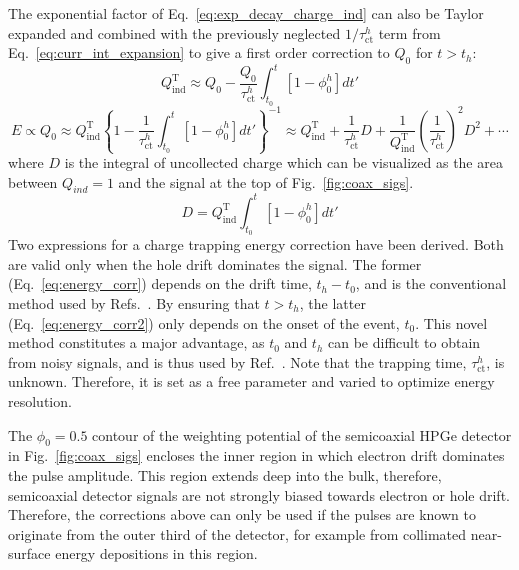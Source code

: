 \noindent The exponential factor of Eq.~\ref{eq:exp_decay_charge_ind} can also be Taylor expanded and combined with the previously neglected $1/\tau^h_\text{ct}$ term from Eq.~\ref{eq:curr_int_expansion} to give a first order correction to $Q_0$ for $t > t_h$:
\begin{equation}
	Q^\text{T}_\text{ind} \approx Q_0 - \frac{Q_0}{\tau^h_\text{ct}}\int_{t_0}^{t}\left[1-\phi^h_0\right]dt'
	\label{eq:charge_ind_corr2}
\end{equation}
\begin{equation}
	E \propto Q_0 \approx Q^\text{T}_\text{ind}\left\{1 - \frac{1}{\tau^h_\text{ct}}\int_{t_0}^{t}\left[1-\phi^h_0\right]dt'\right\}^{-1} \approx Q^\text{T}_\text{ind} + \frac{1}{\tau^h_\text{ct}}D + \frac{1}{Q^\text{T}_\text{ind}}\left(\frac{1}{\tau^h_\text{ct}}\right)^2D^2 + \cdots 
	\label{eq:energy_corr2}
\end{equation}
where $D$ is the integral of uncollected charge which can be visualized as the area between $Q_{ind} = 1$ and the signal at the top of Fig.~\ref{fig:coax_sigs}. 
\begin{equation}
	D = Q^\text{T}_\text{ind}\int_{t_0}^{t}\left[1-\phi^h_0\right]dt'
	\label{eq:uncollected_charge}
\end{equation}
Two expressions for a charge trapping energy correction have been derived. Both are valid only when the hole drift dominates the signal. The former (Eq.~\ref{eq:energy_corr}) depends on the drift time, $t_h-t_0$, and is the conventional method used by Refs.~\cite{ppc_charge_trapping1,ppc_charge_trapping2}. By ensuring that $t > t_h$, the latter (Eq.~\ref{eq:energy_corr2}) only depends on the onset of the event, $t_0$. This novel method constitutes a major advantage, as $t_0$ and $t_h$ can be difficult to obtain from noisy signals, and is thus used by Ref.~\cite{mjd_charge_trapping}. Note that the trapping time, $\tau^h_\text{ct}$, is unknown. Therefore, it is set as a free parameter and varied to optimize energy resolution. 

The $\phi_0 = 0.5$ contour of the weighting potential of the semicoaxial HPGe detector in Fig.~\ref{fig:coax_sigs} encloses the inner region in which electron drift dominates the pulse amplitude. This region extends deep into the bulk, therefore, semicoaxial detector signals are not strongly biased towards electron or hole drift. Therefore, the corrections above can only be used if the pulses are known to originate from the outer third of the detector, for example from collimated near-surface energy depositions in this region. 


